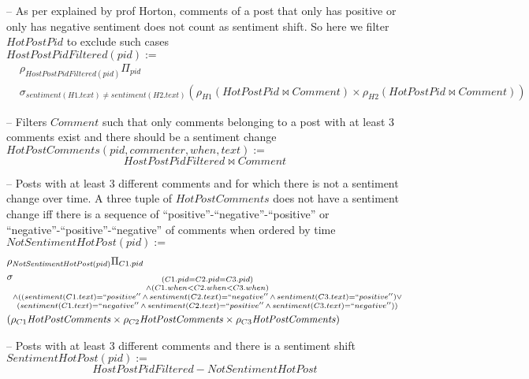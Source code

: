\documentclass{article}
\newcommand{\var}[1]{\mathit{#1}}
\begin{document}
\begin{enumerate}
{-- As per explained by prof Horton, comments of a post that only has positive or only has negative sentiment does not count as sentiment shift. So here we filter $\var{HotPostPid}$ to exclude such cases \\
$\var{HostPostPidFiltered}(pid) :=$
\begin{align*}
    &\rho_{\var{HostPostPidFiltered}(pid)}\Pi_{pid}  \\
    &\sigma_{
        sentiment(H1.text) \neq sentiment(H2.text)
    }
    (\rho_{H1} (\var{HotPostPid}\bowtie \var{Comment}) \times \rho_{H2} (\var{HotPostPid} \bowtie \var{Comment}))
\end{align*}

-- Filters $\var{Comment}$ such that only comments belonging to a post with at least 3 comments exist and there should be a sentiment change\\
$\var{HotPostComments}(pid, commenter, when, text) :=$
\[
    \var{HostPostPidFiltered} \bowtie \var{Comment}
\]

-- Posts with at least 3 different comments and for which there is not a sentiment change over time. A three tuple of $\var{HotPostComments}$ does not have a sentiment change iff there is a sequence of ``positive''-``negative''-``positive'' or ``negative''-``positive''-``negative'' of comments when ordered by time \\
$\var{NotSentimentHotPost}(pid) :=$
\begin{align*}
    &\rho_{\var{NotSentimentHotPost}(pid)} 
    \Pi_{C1.pid} \\ 
    &\sigma_{
        \substack{
            (C1.pid=C2.pid=C3.pid) \\
            \land (C1.when < C2.when < C3.when) \\
            \land ((sentiment(C1.text)=``positive'' \,\land\, sentiment(C2.text)=``negative'' \,\land\, sentiment(C3.text)=``positive'') \lor \\
            (sentiment(C1.text)=``negative'' \,\land\, sentiment(C2.text)=``positive'' \,\land\, sentiment(C3.text)=``negative'')) \\ 
        }
    }\\ 
    &(\rho_{C1} \var{HotPostComments} \times \rho_{C2} \var{HotPostComments} \times \rho_{C3} \var{HotPostComments})
\end{align*}


-- Posts with at least 3 different comments and there is a sentiment shift \\
$\var{SentimentHotPost}(pid) :=$
\[
    \var{HostPostPidFiltered} - \var{NotSentimentHotPost}
\]


}
\end{enumerate}
\end{document}
